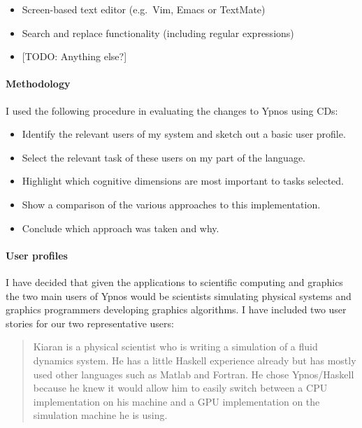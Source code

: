 \begin{itemize}
\itemsep1pt\parskip0pt
\item
  Screen-based text editor (e.g.~Vim, Emacs or TextMate)
\item
  Search and replace functionality (including regular expressions)
\item
  {[}TODO: Anything else?{]}
\end{itemize}

\paragraph{Methodology}

I used the following procedure in evaluating the changes to Ypnos using
CDs:

\begin{itemize}
\itemsep1pt\parskip0pt
\item
  Identify the relevant users of my system and sketch out a basic user
  profile.
\item
  Select the relevant task of these users on my part of the language.
\item
  Highlight which cognitive dimensions are most important to tasks
  selected.
\item
  Show a comparison of the various approaches to this implementation.
\item
  Conclude which approach was taken and why.
\end{itemize}

\paragraph{User profiles}

I have decided that given the applications to scientific computing and
graphics the two main users of Ypnos would be scientists simulating
physical systems and graphics programmers developing graphics
algorithms. I have included two user stories for our two representative
users:

\begin{quote}
Kiaran is a physical scientist who is writing a simulation of a fluid
dynamics system. He has a little Haskell experience already but has
mostly used other languages such as Matlab and Fortran. He chose
Ypnos/Haskell because he knew it would allow him to easily switch
between a CPU implementation on his machine and a GPU implementation on
the simulation machine he is using.
\end{quote}

